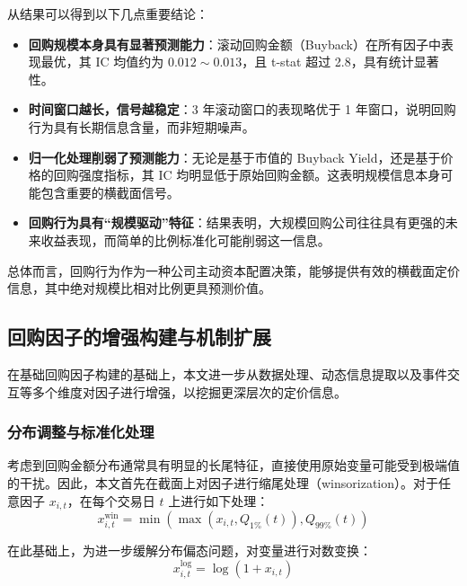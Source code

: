 \documentclass[a4paper,10pt]{article}
\begin{document}
从结果可以得到以下几点重要结论：

\begin{itemize}
    \item \textbf{回购规模本身具有显著预测能力}：滚动回购金额（Buyback）在所有因子中表现最优，其 IC 均值约为 $0.012 \sim 0.013$，且 t-stat 超过 2.8，具有统计显著性。
    
    \item \textbf{时间窗口越长，信号越稳定}：3 年滚动窗口的表现略优于 1 年窗口，说明回购行为具有长期信息含量，而非短期噪声。
    
    \item \textbf{归一化处理削弱了预测能力}：无论是基于市值的 Buyback Yield，还是基于价格的回购强度指标，其 IC 均明显低于原始回购金额。这表明规模信息本身可能包含重要的横截面信号。
    
    \item \textbf{回购行为具有“规模驱动”特征}：结果表明，大规模回购公司往往具有更强的未来收益表现，而简单的比例标准化可能削弱这一信息。
\end{itemize}

总体而言，回购行为作为一种公司主动资本配置决策，能够提供有效的横截面定价信息，其中绝对规模比相对比例更具预测价值。




\subsection{回购因子的增强构建与机制扩展}

在基础回购因子构建的基础上，本文进一步从数据处理、动态信息提取以及事件交互等多个维度对因子进行增强，以挖掘更深层次的定价信息。

\subsubsection{分布调整与标准化处理}

考虑到回购金额分布通常具有明显的长尾特征，直接使用原始变量可能受到极端值的干扰。因此，本文首先在截面上对因子进行缩尾处理（winsorization）。对于任意因子 $x_{i,t}$，在每个交易日 $t$ 上进行如下处理：
\begin{equation}
x^{\text{win}}_{i,t} = \min\left( \max\left(x_{i,t}, Q_{1\%}(t)\right), Q_{99\%}(t) \right)
\end{equation}

在此基础上，为进一步缓解分布偏态问题，对变量进行对数变换：
\begin{equation}
x^{\log}_{i,t} = \log(1 + x_{i,t})
\end{equation}
\end{document}
